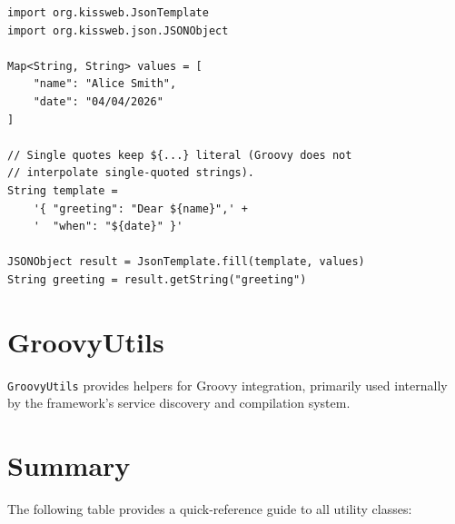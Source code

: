 \begin{lstlisting}[style=groovy]
import org.kissweb.JsonTemplate
import org.kissweb.json.JSONObject

Map<String, String> values = [
    "name": "Alice Smith",
    "date": "04/04/2026"
]

// Single quotes keep ${...} literal (Groovy does not
// interpolate single-quoted strings).
String template =
    '{ "greeting": "Dear ${name}",' +
    '  "when": "${date}" }'

JSONObject result = JsonTemplate.fill(template, values)
String greeting = result.getString("greeting")
\end{lstlisting}

\section{GroovyUtils}
\label{sec:util-groovyutils}

\texttt{GroovyUtils} provides helpers for Groovy integration, primarily used internally by the framework's service discovery and compilation system.

\section{Summary}
\label{sec:util-summary}

The following table provides a quick-reference guide to all utility classes:

